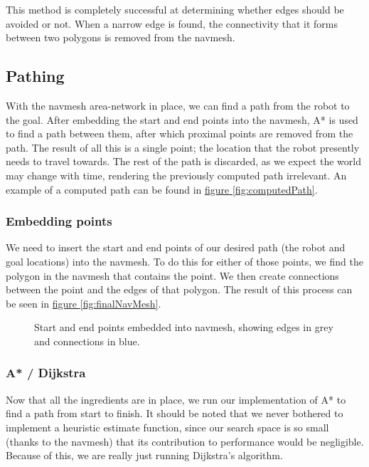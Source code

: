 \documentclass[10pt, abstracton, twocolumn]{scrartcl}
\newcommand{\fref}[1]{\hyperref[#1]{figure \vref{#1}}}
\begin{document}
This method is completely successful at determining whether edges should be avoided or not. When a narrow edge is found, the connectivity that it forms between two polygons is removed from the navmesh.

\subsection{Pathing}
With the navmesh area-network in place, we can find a path from the robot to the goal. After embedding the start and end points into the navmesh, A* is used to find a path between them, after which proximal points are removed from the path. The result of all this is a single point; the location that the robot presently needs to travel towards. The rest of the path is discarded, as we expect the world may change with time, rendering the previously computed path irrelevant. An example of a computed path can be found in \fref{fig:computedPath}.

\subsubsection{Embedding points}
We need to insert the start and end points of our desired path (the robot and goal locations) into the navmesh. To do this for either of those points, we find the polygon in the navmesh that contains the point. We then create connections between the point and the edges of that polygon. The result of this process can be seen in \fref{fig:finalNavMesh}.

\begin{figure}
        \centering
        
        \caption{\small Start and end points embedded into navmesh, showing edges in grey and connections in blue.}
        \label{fig:finalNavMesh}
\end{figure}

\subsubsection{A* / Dijkstra}

Now that all the ingredients are in place, we run our implementation of A* to find a path from start to finish. It should be noted that we never bothered to implement a heuristic estimate function, since our search space is so small (thanks to the navmesh) that its contribution to performance would be negligible. Because of this, we are really just running Dijkstra's algorithm.
\end{document}
